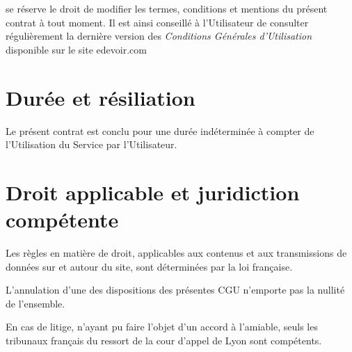 \eDevoir se réserve le droit de modifier les termes, conditions et mentions du présent contrat à tout moment.
Il est ainsi conseillé à l'Utilisateur de consulter régulièrement la dernière version des \textit{Conditions Générales d'Utilisation} disponible sur le site edevoir.com


\section{Durée et résiliation}

Le présent contrat est conclu pour une durée indéterminée à compter de l'Utilisation du Service par l'Utilisateur.


\section{Droit applicable et juridiction compétente}

Les règles en matière de droit, applicables aux contenus et aux transmissions de données sur et autour du site, sont déterminées par la loi française.

L'annulation d'une des dispositions des présentes CGU n'emporte pas la nullité de l'ensemble.

En cas de litige, n'ayant pu faire l'objet d'un accord à l'amiable, seuls les tribunaux français du ressort de la cour d'appel de Lyon sont compétents.
